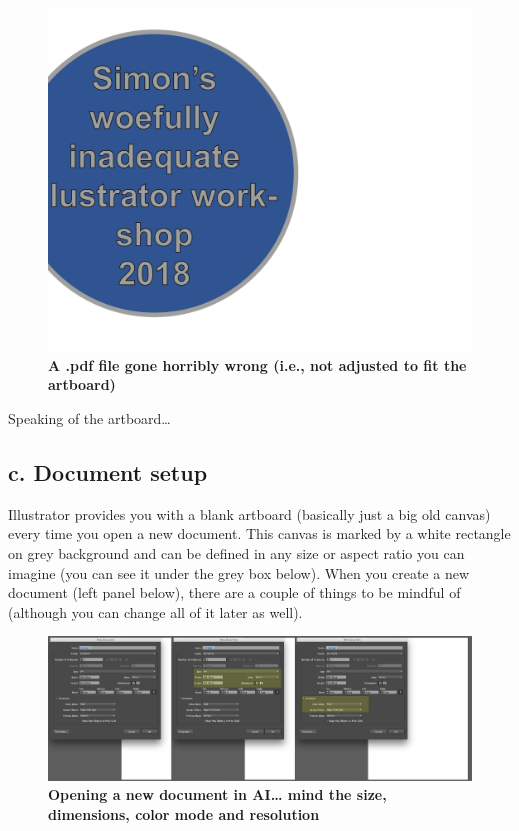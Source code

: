 \documentclass[]{article}
\begin{document}
\begin{figure}
\centering
\includegraphics{Symbol1pdf.jpg}
\caption{\textbf{A .pdf file gone horribly wrong (i.e., not adjusted to
fit the artboard)}}
\end{figure}

Speaking of the artboard\ldots{}

\subsection{c. Document setup}\label{c.-document-setup}

Illustrator provides you with a blank artboard (basically just a big old
canvas) every time you open a new document. This canvas is marked by a
white rectangle on grey background and can be defined in any size or
aspect ratio you can imagine (you can see it under the grey box below).
When you create a new document (left panel below), there are a couple of
things to be mindful of (although you can change all of it later as
well).

\begin{figure}
\centering
\includegraphics{NewDocumentComb.png}
\caption{\textbf{Opening a new document in AI\ldots{} mind the size,
dimensions, color mode and resolution}}
\end{figure}
\end{document}
